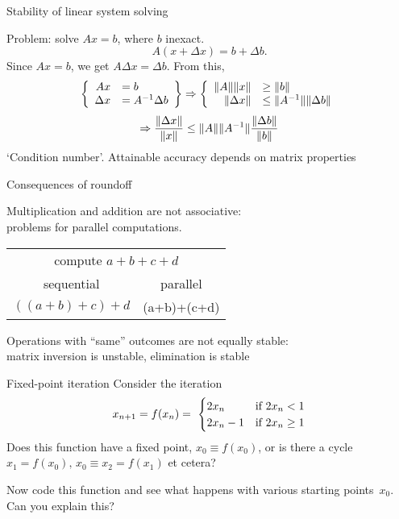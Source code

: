 \begin{numberedframe}{Stability of linear system solving}

Problem: solve $Ax=b$, where $b$ inexact.
\[ A(x+\Delta x)=b+\Delta b. \]
Since $Ax=b$, we get $A\Delta x=\Delta b$. From this,
\[
 \left \{
\begin{array}{rl}
  Ax&=b\\ \Delta x&=A^{-1} \Delta b\\ 
\end{array} \right\} \Rightarrow \left\{
\begin{array}{rl}
  \|A\| \|x\|&\geq\|b\| \\ \|\Delta x\|&\leq \|A^{-1}\| \|\Delta b\|
\end{array} \right.
\]
\[
\Rightarrow
\frac{\|\Delta x\|}{\|x\|}
\leq 
\|A\| \|A^{-1}\| \frac{\|\Delta b\|}{\|b\|}
\]
`Condition number'. Attainable accuracy depends on matrix properties
\end{numberedframe}

\begin{numberedframe}{Consequences of roundoff}

Multiplication and addition are not associative:\\
problems for parallel computations.

\begin{tabular}{cc}
  \midrule
  \multicolumn{2}{c}{compute $a+b+c+d$}\\
  sequential&parallel\\
  \midrule
  $((a+b)+c)+d$&(a+b)+(c+d)\\
  \midrule
\end{tabular}

Operations with ``same'' outcomes are not equally stable:\\
matrix inversion is unstable, elimination is stable
\end{numberedframe}

\begin{exercise}{Fixed-point iteration}
  Consider the iteration
  \[ x_{n+1}=f(x_n) = \
  \begin{cases}
    2x_n&\hbox{if $2x_n<1$}\\
    2x_n-1&\hbox{if $2x_n\geq 1$}\\
  \end{cases}
  \]
  Does this function have a fixed point, $x_0\equiv f(x_0)$, or is there a cycle
  $x_1=f(x_0),\,x_0\equiv x_2=f(x_1)$ et cetera?

  Now code this function and see what happens with various starting
  points~$x_0$. Can you explain this?
\end{exercise}

